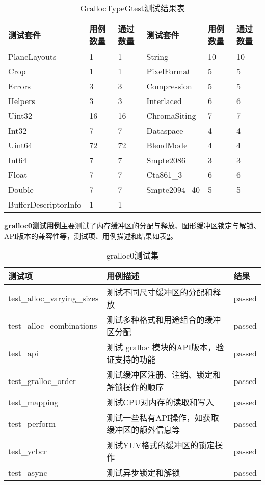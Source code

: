 \begin{table}[H]
    \centering
    \caption{GrallocTypeGtest测试结果表}
    \label{tab:GrallocTypeGtest测试结果表}
    \begin{tabular}{llllll}
      \toprule
      测试套件 & 用例数量 &通过数量 & 测试套件 & 用例数量 &通过数量\\
      \midrule
      PlaneLayouts & 1 & 1 & String & 10 & 10 \\
      Crop & 1 & 1 & PixelFormat & 5 & 5 \\
      Errors & 3 & 3 & Compression & 5 & 5 \\
      Helpers & 3 & 3 & Interlaced & 6 & 6 \\
      Uint32 & 16 & 16 & ChromaSiting & 7 & 7 \\
      Int32 & 7 & 7 & Dataspace & 4 & 4 \\
      Uint64 & 72 & 72 & BlendMode & 4 & 4 \\
      Int64 & 7 & 7 & Smpte2086 & 3 & 3 \\
      Float & 7 & 7 & Cta861\_3 & 6 & 6 \\
      Double & 7 & 7 & Smpte2094\_40 & 5 & 5 \\
      BufferDescriptorInfo & 1 & 1 \\
      \bottomrule
    \end{tabular}
    \note{}
\end{table}


\textbf{gralloc0测试用例}主要测试了内存缓冲区的分配与释放、图形缓冲区锁定与解锁、API版本的兼容性等，测试项、用例描述和结果如表\ref{tab:gralloc0测试集}。

\begin{table}[H]
    \centering
    \caption{gralloc0测试集}
    \label{tab:gralloc0测试集}
    \begin{tabular}{lll}
      \toprule
      测试项 & 用例描述 & 结果 \\
      \midrule
      test\_alloc\_varying\_sizes & 测试不同尺寸缓冲区的分配和释放 & passed\\
      test\_alloc\_combinations & 测试多种格式和用途组合的缓冲区分配 & passed\\
      test\_api & 测试 gralloc 模块的API版本，验证支持的功能 & passed\\
      test\_gralloc\_order & 测试缓冲区注册、注销、锁定和解锁操作的顺序 & passed\\
      test\_mapping & 测试CPU对内存的读取和写入 & passed\\
      test\_perform & 测试一些私有API操作，如获取缓冲区的额外信息等 & passed\\
      test\_ycbcr & 测试YUV格式的缓冲区的锁定操作 & passed\\
      test\_async & 测试异步锁定和解锁 & passed\\
      \bottomrule
    \end{tabular}
    \note{}
\end{table}

